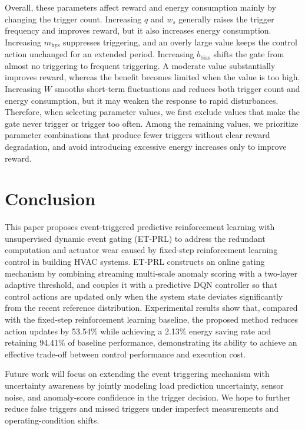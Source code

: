 \documentclass[preprint,12pt,number]{elsarticle}
\begin{document}
Overall, these parameters affect reward and energy consumption mainly by changing the trigger count. Increasing \(q\) and \(w_s\) generally raises the trigger frequency and improves reward, but it also increases energy consumption. Increasing \(m_{\mathrm{hys}}\) suppresses triggering, and an overly large value keeps the control action unchanged for an extended period. Increasing \(b_{\mathrm{bias}}\) shifts the gate from almost no triggering to frequent triggering. A moderate value substantially improves reward, whereas the benefit becomes limited when the value is too high. Increasing \(W\) smooths short-term fluctuations and reduces both trigger count and energy consumption, but it may weaken the response to rapid disturbances. Therefore, when selecting parameter values, we first exclude values that make the gate never trigger or trigger too often. Among the remaining values, we prioritize parameter combinations that produce fewer triggers without clear reward degradation, and avoid introducing excessive energy increases only to improve reward.

\section{Conclusion}\label{conclusion}

This paper proposes event-triggered predictive reinforcement learning with unsupervised dynamic event gating (ET-PRL) to address the redundant computation and actuator wear caused by fixed-step reinforcement learning control in building HVAC systems. ET-PRL constructs an online gating mechanism by combining streaming multi-scale anomaly scoring with a two-layer adaptive threshold, and couples it with a predictive DQN controller so that control actions are updated only when the system state deviates significantly from the recent reference distribution. Experimental results show that, compared with the fixed-step reinforcement learning baseline, the proposed method reduces action updates by 53.54\% while achieving a 2.13\% energy saving rate and retaining 94.41\% of baseline performance, demonstrating its ability to achieve an effective trade-off between control performance and execution cost.

Future work will focus on extending the event triggering mechanism with uncertainty awareness by jointly modeling load prediction uncertainty, sensor noise, and anomaly-score confidence in the trigger decision. We hope to further reduce false triggers and missed triggers under imperfect measurements and operating-condition shifts.
\end{document}
